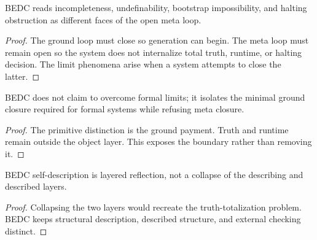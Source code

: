 \begin{theorem}
\label{thm:philosophy-limit-results-open-meta-loop}
BEDC reads incompleteness, undefinability, bootstrap impossibility, and
halting obstruction as different faces of the open meta loop.
\end{theorem}
\begin{proof}
The ground loop must close so generation can begin. The meta loop must
remain open so the system does not internalize total truth, runtime, or
halting decision. The limit phenomena arise when a system attempts to
close the latter.
\end{proof}

\begin{corollary}
\label{cor:philosophy-bedc-does-not-bypass-limits}
BEDC does not claim to overcome formal limits; it isolates the minimal
ground closure required for formal systems while refusing meta closure.
\end{corollary}
\begin{proof}
The primitive distinction is the ground payment. Truth and runtime
remain outside the object layer. This exposes the boundary rather than
removing it.
\end{proof}

\begin{corollary}
\label{cor:philosophy-reflection-not-strange-loop}
BEDC self-description is layered reflection, not a collapse of the
describing and described layers.
\end{corollary}
\begin{proof}
Collapsing the two layers would recreate the truth-totalization
problem. BEDC keeps structural description, described structure, and
external checking distinct.
\end{proof}


